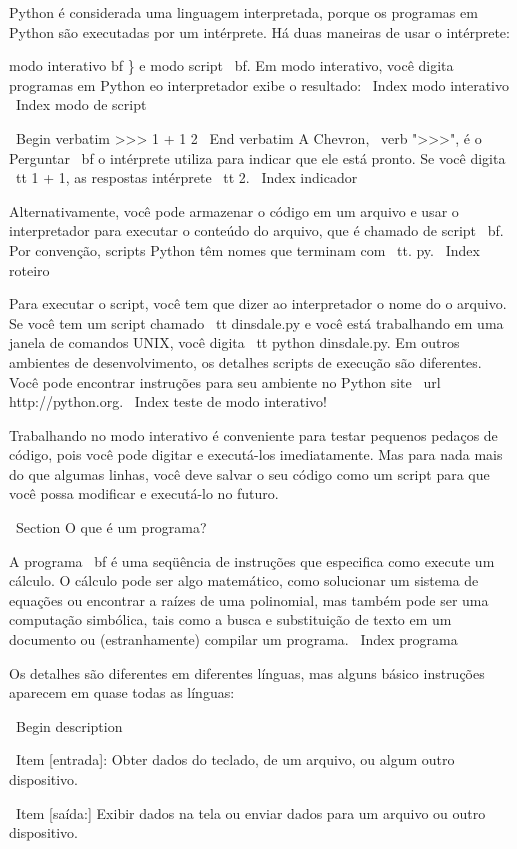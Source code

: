\documentclass[10pt]{book}
\begin{document}
Python é considerada uma linguagem interpretada, porque os programas em Python
são executadas por um intérprete. Há duas maneiras de usar o
intérprete: {modo interativo bf \} e {modo script \ bf}. Em
modo interativo, você digita programas em Python eo interpretador exibe
o resultado:
\ Index {modo interativo}
\ Index {modo de script}

\ Begin {verbatim}
>>> 1 + 1
2
\ End {verbatim}
%
A Chevron, \ verb ">>>", é o
{Perguntar \ bf} o intérprete utiliza para indicar que ele está pronto. Se
você digita {\ tt 1 + 1}, as respostas intérprete {\ tt 2}.
\ Index {indicador}

Alternativamente, você pode armazenar o código em um arquivo e usar o interpretador para
executar o conteúdo do arquivo, que é chamado de {script \ bf}. Por
convenção, scripts Python têm nomes que terminam com {\ tt. py}.
\ Index {} roteiro

Para executar o script, você tem que dizer ao interpretador o nome do
o arquivo. Se você tem um script chamado {\ tt dinsdale.py} e você está
trabalhando em uma janela de comandos UNIX, você digita {\ tt python
dinsdale.py}. Em outros ambientes de desenvolvimento, os detalhes
scripts de execução são diferentes. Você pode encontrar instruções para
seu ambiente no Python site \ url {http://python.org}.
\ Index {teste de modo interativo!}

Trabalhando no modo interativo é conveniente para testar pequenos pedaços de
código, pois você pode digitar e executá-los imediatamente. Mas para
nada mais do que algumas linhas, você deve salvar o seu código
como um script para que você possa modificar e executá-lo no futuro.


\ Section {O que é um programa?}

A {programa \ bf} é uma seqüência de instruções que especifica como
execute um cálculo. O cálculo pode ser algo
matemático, como solucionar um sistema de equações ou encontrar a
raízes de uma polinomial, mas também pode ser uma computação simbólica, tais
como a busca e substituição de texto em um documento ou (estranhamente)
compilar um programa.
\ Index {programa}

Os detalhes são diferentes em diferentes línguas, mas alguns básico
instruções aparecem em quase todas as línguas:

\ Begin {description}

\ Item [entrada]: Obter dados do teclado, de um arquivo, ou algum
outro dispositivo.

\ Item [saída:] Exibir dados na tela ou enviar dados para um
arquivo ou outro dispositivo.

}
\end{document}
